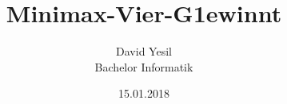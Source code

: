 \documentclass{beamer}
\title{Minimax-Vier-G1ewinnt}
\author{David Yesil \\ 
Bachelor Informatik}
\institute{Hochschule Augsburg}
\date{15.01.2018}
\begin{document}
	\begin{frame}
		 \titlepage 
	\end{frame}
	
	
	
	
	
	

	
	
\end{document}
